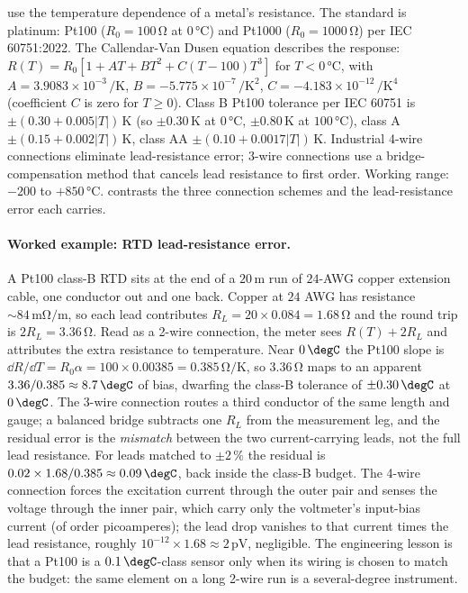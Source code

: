  use the
temperature dependence of a metal's resistance. The standard is
platinum: Pt100 ($R_{0} = 100\,\si{\ohm}$ at $0\,\si{
\degreeCelsius}$) and Pt1000 ($R_{0} = 1000\,\si{\ohm}$) per
IEC 60751:2022. The Callendar-Van Dusen equation describes the
response: $R(T) = R_{0}[1 + A T + B T^{2} + C(T - 100)T^{3}]$ for
$T < 0\,\si{\degreeCelsius}$, with $A = 3.9083 \times 10^{-3}\,
\si{\per\kelvin}$, $B = -5.775 \times 10^{-7}\,\si{\per\kelvin
\squared}$, $C = -4.183 \times 10^{-12}\,\si{\per\kelvin\tothe{4}}$
(coefficient $C$ is zero for $T \geq 0$). Class B Pt100 tolerance
per IEC 60751 is $\pm (0.30 + 0.005|T|)\,\si{\kelvin}$ (so
$\pm 0.30\,\si{\kelvin}$ at $0\,\si{\degreeCelsius}$,
$\pm 0.80\,\si{\kelvin}$ at $100\,\si{\degreeCelsius}$), class A
$\pm (0.15 + 0.002|T|)\,\si{\kelvin}$, class AA $\pm (0.10 +
0.0017|T|)\,\si{\kelvin}$. Industrial 4-wire connections
eliminate lead-resistance error; 3-wire connections use a
bridge-compensation method that cancels lead resistance to
first order. Working range: $-200$ to $+850\,\si{\degreeCelsius}$.
 contrasts the three connection
schemes and the lead-resistance error each carries.



\paragraph{Worked example: RTD lead-resistance error.} A Pt100
class-B RTD sits at the end of a $20 \,\si{\meter}$ run of
$24$-AWG copper extension cable, one conductor out and one back.
Copper at $24$ AWG has resistance $\sim 84 \,\si{\milli\ohm\per
\meter}$, so each lead contributes $R_{L} = 20 \times 0.084 =
1.68 \,\si{\ohm}$ and the round trip is $2 R_{L} = 3.36 \,\si{
\ohm}$. Read as a 2-wire connection, the meter sees $R(T) + 2 R_{L}$
and attributes the extra resistance to temperature. Near
$0 \,\degC$ the Pt100 slope is $\dd R/\dd T = R_{0} \alpha =
100 \times 0.00385 = 0.385 \,\si{\ohm\per\kelvin}$, so
$3.36 \,\si{\ohm}$ maps to an apparent
$3.36/0.385 \approx 8.7 \,\degC$ of bias, dwarfing the class-B
tolerance of $\pm 0.30 \,\degC$ at $0 \,\degC$. The 3-wire
connection routes a third conductor of the same length and gauge;
a balanced bridge subtracts one $R_{L}$ from the measurement leg,
and the residual error is the \emph{mismatch} between the two
current-carrying leads, not the full lead resistance. For leads
matched to $\pm 2\,\%$ the residual is
$0.02 \times 1.68/0.385 \approx 0.09 \,\degC$, back inside the
class-B budget. The 4-wire connection forces the excitation current
through the outer pair and senses the voltage through the inner
pair, which carry only the voltmeter's input-bias current (of order
picoamperes); the lead drop vanishes to that current times the lead
resistance, roughly $10^{-12} \times 1.68 \approx 2 \,\si{\pico
\volt}$, negligible. The engineering lesson is that a Pt100 is a
$0.1 \,\degC$-class sensor only when its wiring is chosen to match
the budget: the same element on a long 2-wire run is a
several-degree instrument.

